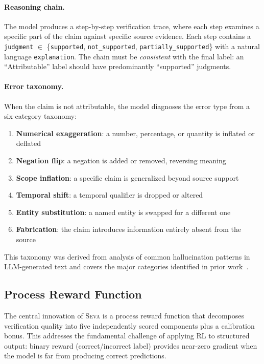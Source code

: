 \documentclass{article}
\newcommand{\seva}{\textsc{Seva}}
\begin{document}
\paragraph{Reasoning chain.}
The model produces a step-by-step verification trace, where each step examines a specific part of the claim against specific source evidence.
Each step contains a \texttt{judgment} $\in$ \{\texttt{supported}, \texttt{not\_supported}, \texttt{partially\_supported}\} with a natural language \texttt{explanation}.
The chain must be \emph{consistent} with the final label: an ``Attributable'' label should have predominantly ``supported'' judgments.

\paragraph{Error taxonomy.}
\label{sec:taxonomy}
When the claim is not attributable, the model diagnoses the error type from a six-category taxonomy:
\begin{enumerate}[nosep,leftmargin=*]
  \item \textbf{Numerical exaggeration}: a number, percentage, or quantity is inflated or deflated
  \item \textbf{Negation flip}: a negation is added or removed, reversing meaning
  \item \textbf{Scope inflation}: a specific claim is generalized beyond source support
  \item \textbf{Temporal shift}: a temporal qualifier is dropped or altered
  \item \textbf{Entity substitution}: a named entity is swapped for a different one
  \item \textbf{Fabrication}: the claim introduces information entirely absent from the source
\end{enumerate}
This taxonomy was derived from analysis of common hallucination patterns in LLM-generated text and covers the major categories identified in prior work~\citep{maynez2020faithfulness, pagnoni2021understanding}.


\subsection{Process Reward Function}
\label{sec:reward}

The central innovation of \seva{} is a process reward function that decomposes verification quality into five independently scored components plus a calibration bonus.
This addresses the fundamental challenge of applying RL to structured output: binary reward (correct/incorrect label) provides near-zero gradient when the model is far from producing correct predictions.
\end{document}
